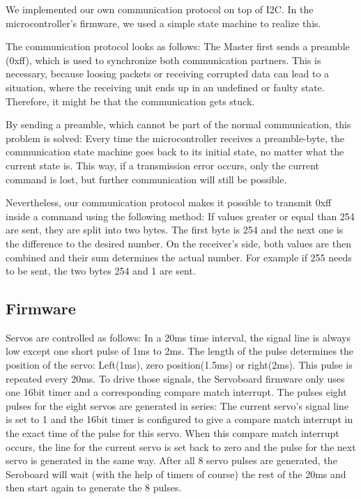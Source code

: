\documentclass[a4paper
               ,10pt
               ,DIV=10 %
               ,BCOR=0.3cm
               ,pagesize %
               ,headings=small
               ,bibtotoc
               ]
               {scrartcl}
\begin{document}
We implemented our own communication protocol on top of I2C.
In the microcontroller's firmware, we used a simple state machine to realize this.

The communication protocol looks as follows:
The Master first sends a preamble (0xff), which is used to synchronize both communication partners.
This is necessary, because loosing packets or receiving corrupted data can lead to a situation, where the receiving unit ends up in an undefined or faulty state.
Therefore, it might be that the communication gets stuck.

By sending a preamble, which cannot be part of the normal communication, this problem is solved: Every time the microcontroller receives a preamble-byte, the communication state machine goes back to its initial state, no matter what the current state is.
This way, if a transmission error occurs, only the current command is lost, but further communication will still be possible.


Nevertheless, our communication protocol makes it possible to transmit 0xff inside a command using the following method:
If values greater or equal than 254 are sent, they are split into two bytes.
The first byte is 254 and the next one is the difference to the desired number.
On the receiver's side, both values are then combined and their sum determines the actual number. 
For example if 255 needs to be sent, the two bytes 254 and 1 are sent.

\subsection{Firmware}
Servos are controlled as follows: 
In a 20ms time interval, the signal line is always low except one short pulse of 1ms to 2ms.
The length of the pulse determines the position of the servo:
Left(1ms), zero position(1.5ms) or right(2ms).
This pulse is repeated every 20ms.
To drive those signals, the Servoboard firmware only uses one 16bit timer and a corresponding compare match interrupt.
The pulses eight pulses for the eight servos are generated in series: The current servo's signal line is set to 1 and the 16bit timer is configured to give a compare match interrupt in the exact time of the pulse for this servo.
When this compare match interrupt occurs, the line for the current servo is set back to zero and the pulse for the next servo is generated in the same way.
After all 8 servo pulses are generated, the Seroboard will wait (with the help of timers of course) the rest of the 20ms and then start again to generate the 8 pulses.
\end{document}
